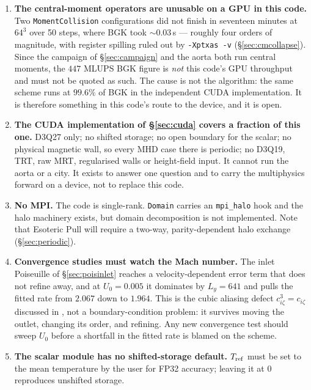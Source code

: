 \documentclass[11pt,a4paper]{article}
\newcommand{\code}[1]{\texttt{\small #1}}
\begin{document}
\begin{enumerate}[leftmargin=1.4em,itemsep=4pt]
\item \textbf{The central-moment operators are unusable on a GPU in this code.}
  Two \code{MomentCollision} configurations did not finish in seventeen minutes at
  $64^3$ over 50 steps, where BGK took $\sim0.03$\,s --- roughly four orders of
  magnitude, with register spilling ruled out by \code{-Xptxas -v}
  (\S\ref{sec:cmcollapse}). Since the campaign of \S\ref{sec:campaign} and the
  aorta both run central moments, the $447$ MLUPS BGK figure is \emph{not} this
  code's GPU throughput and must not be quoted as such. The cause is not the
  algorithm: the same scheme runs at $99.6\%$ of BGK in the independent CUDA
  implementation. It is therefore something in this code's route to the device,
  and it is open.

\item \textbf{The CUDA implementation of \S\ref{sec:cuda} covers a fraction of
  this one.} D3Q27 only; no shifted storage; no open boundary for the scalar; no
  physical magnetic wall, so every MHD case there is periodic; no D3Q19, TRT, raw
  MRT, regularised walls or height-field input. It cannot run the aorta or a city.
  It exists to answer one question and to carry the multiphysics forward on a
  device, not to replace this code.

\item \textbf{No MPI.} The code is single-rank. \code{Domain} carries an
  \code{mpi\_halo} hook and the halo machinery exists, but domain decomposition
  is not implemented. Note that Esoteric Pull will require a two-way,
  parity-dependent halo exchange (\S\ref{sec:periodic}).

\item \textbf{Convergence studies must watch the Mach number.} The inlet
Poiseuille of \S\ref{sec:poisinlet} reaches a velocity-dependent error term
that does not refine away, and at $U_0 = 0.005$ it dominates by $L_y = 641$ and
pulls the fitted rate from $2.067$ down to $1.964$. This is the cubic aliasing
defect $c_{i\zeta}^3 = c_{i\zeta}$ discussed in \cite{derosis2020}, not a
boundary-condition problem: it survives moving the outlet, changing its order,
and refining. Any new convergence test should sweep $U_0$ before a shortfall in
the fitted rate is blamed on the scheme.

\item \textbf{The scalar module has no shifted-storage default.}
  $T_{\rm ref}$ must be set to the mean temperature by the user for FP32 accuracy;
  leaving it at $0$ reproduces unshifted storage.


\end{enumerate}
\end{document}
